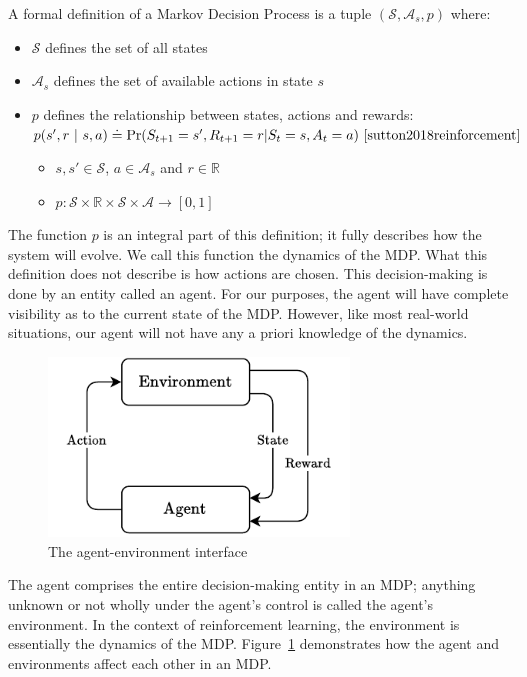 \documentclass[]{final_report}
\begin{document}
A formal definition of a Markov Decision Process is a tuple $(\mathcal{S},\mathcal{A}_s,p)$ where:
\begin{itemize}
  \item $\mathcal{S}$ defines the set of all states
  \item $\mathcal{A}_s$ defines the set of available actions in state $s$
  \item $p$ defines the relationship between states, actions and rewards: \\
        $p(s',r\ |\ s,a) \doteq \Pr(S_{t+1} = s', R_{t+1} = r | S_t = s, A_t = a)~\cite{sutton2018reinforcement}$
        \begin{itemize}
          \item $s, s' \in \mathcal{S}$, $a \in \mathcal{A}_s$ and $r \in \mathbb{R}$
          \item $p: \mathcal{S} \times \mathbb{R} \times \mathcal{S} \times \mathcal{A} \rightarrow [0,1]$
        \end{itemize}
\end{itemize}

The function $p$ is an integral part of this definition; it fully describes how the system will evolve. We call this function the dynamics of the MDP. What this definition does not describe is how actions are chosen. This decision-making is done by an entity called an agent. For our purposes, the agent will have complete visibility as to the current state of the MDP. However, like most real-world situations, our agent will not have any a priori knowledge of the dynamics. 

\begin{figure}[H]
  \centering
  
  \includegraphics[width=8cm]{agent-enviroment-2}
  
  \caption{\label{fig:agent-enviroment} The agent-environment interface}
\end{figure}

The agent comprises the entire decision-making entity in an MDP; anything unknown or not wholly under the agent's control is called the agent's environment. In the context of reinforcement learning, the environment is essentially the dynamics of the MDP. Figure~\ref{fig:agent-enviroment} demonstrates how the agent and environments affect each other in an MDP. 
\end{document}
